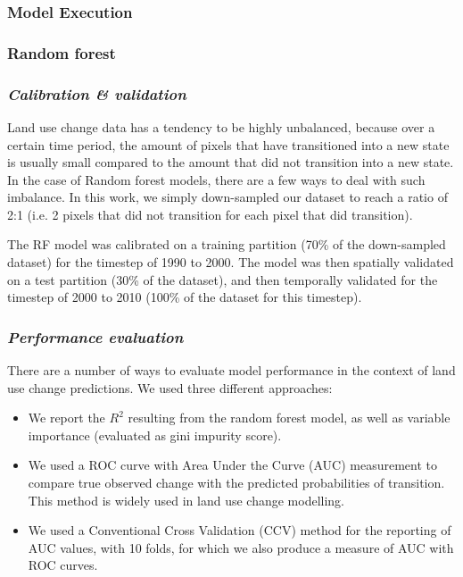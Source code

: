 \subsubsection{Model Execution}

\subsubsection*{Random forest}

\subsubsection*{\textit{Calibration \& validation}}

Land use change data has a tendency to be highly unbalanced, because over a certain time period, the amount of pixels that have transitioned into a new state is usually small compared to the amount that did not transition into a new state. In the case of Random forest models, there are a few ways to deal with such imbalance. In this work, we simply down-sampled our dataset to reach a ratio of 2:1 (i.e. 2 pixels that did not transition for each pixel that did transition). 

The RF model was calibrated on a training partition (70\% of the down-sampled dataset) for the timestep of 1990 to 2000. The model was then spatially validated on a test partition (30\% of the dataset), and then temporally validated for the timestep of 2000 to 2010 (100\% of the dataset for this timestep). \\

\subsubsection*{\textit{Performance evaluation}}

There are a number of ways to evaluate model performance in the context of land use change predictions. We used three different approaches:
\begin{itemize}
  \item We report the $R^{2}$ resulting from the random forest model, as well as variable importance (evaluated as gini impurity score).
  \item We used a ROC curve with Area Under the Curve (AUC) measurement to compare true observed change with the predicted probabilities of transition. This method is widely used in land use change modelling.
  \item We used a Conventional Cross Validation (CCV) method for the reporting of AUC values, with 10 folds, for which we also produce a measure of AUC with ROC curves.\\
\end{itemize}

